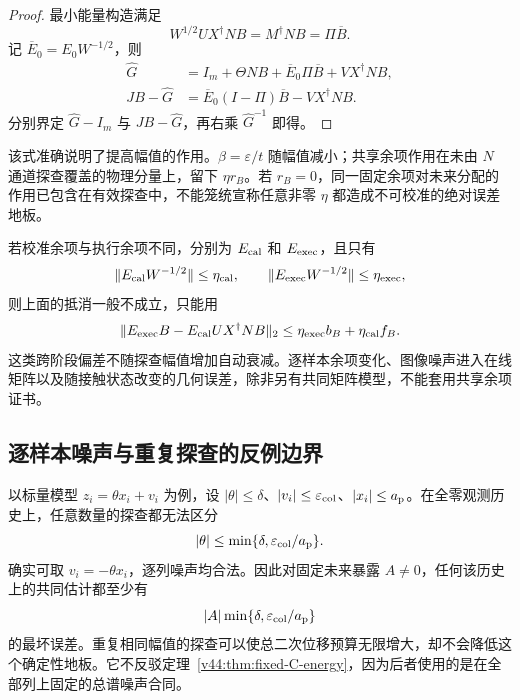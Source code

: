 \documentclass[11pt,a4paper]{article}
\numberwithin{equation}{section}
\theoremstyle{definition}
\begin{document}
\begin{proof}
最小能量构造满足
\begin{equation}
 W^{1/2}UX^\dagger NB=M^\dagger NB=\Pi\overline B.
\end{equation}
记 $\overline E_0=E_0W^{-1/2}$，则
\begin{align}
 \widehat G
 &=I_m+\Theta NB+\overline E_0\Pi\overline B+VX^\dagger NB,\\
 JB-\widehat G
 &=\overline E_0(I-\Pi)\overline B-VX^\dagger NB.
\end{align}
分别界定 $\widehat G-I_m$ 与 $JB-\widehat G$，再右乘 $\widehat G^{-1}$ 即得。
\end{proof}

该式准确说明了提高幅值的作用。$\beta=\varepsilon/t$ 随幅值减小；共享余项作用在未由 $N$ 通道探查覆盖的物理分量上，留下 $\eta r_B$。若 $r_B=0$，同一固定余项对未来分配的作用已包含在有效探查中，不能笼统宣称任意非零 $\eta$ 都造成不可校准的绝对误差地板。

若校准余项与执行余项不同，分别为 $E_{\rm cal}$ 和 $E_{\rm exec}$，且只有
\[
 \|E_{\rm cal}W^{-1/2}\|\le\eta_{\rm cal},
 \qquad \|E_{\rm exec}W^{-1/2}\|\le\eta_{\rm exec},
\]
则上面的抵消一般不成立，只能用
\begin{equation}
 \|E_{\rm exec}B-E_{\rm cal}UX^\dagger NB\|_2
 \le\eta_{\rm exec}b_B+\eta_{\rm cal}f_B.
 \label{v44:eq:cross-stage-remainder-floor}
\end{equation}
这类跨阶段偏差不随探查幅值增加自动衰减。逐样本余项变化、图像噪声进入在线矩阵以及随接触状态改变的几何误差，除非另有共同矩阵模型，不能套用共享余项证书。

\subsection{逐样本噪声与重复探查的反例边界}

以标量模型 $z_i=\theta x_i+v_i$ 为例，设 $|\theta|\le\delta$、$|v_i|\le\varepsilon_{\rm col}$、$|x_i|\le a_{\rm p}$。在全零观测历史上，任意数量的探查都无法区分
\begin{equation}
 |\theta|\le\min\{\delta,\varepsilon_{\rm col}/a_{\rm p}\}.
\end{equation}
确实可取 $v_i=-\theta x_i$，逐列噪声均合法。因此对固定未来暴露 $A\ne0$，任何该历史上的共同估计都至少有
\begin{equation}
 |A|\min\{\delta,\varepsilon_{\rm col}/a_{\rm p}\}
 \label{v44:eq:per-column-noise-floor}
\end{equation}
的最坏误差。重复相同幅值的探查可以使总二次位移预算无限增大，却不会降低这个确定性地板。它不反驳定理~\ref{v44:thm:fixed-C-energy}，因为后者使用的是在全部列上固定的总谱噪声合同。
\end{document}
